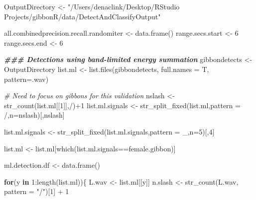 \documentclass[
]{book}
\newenvironment{Shaded}{\begin{snugshade}}{\end{snugshade}}
\newcommand{\AttributeTok}[1]{\textcolor[rgb]{0.77,0.63,0.00}{#1}}
\newcommand{\CommentTok}[1]{\textcolor[rgb]{0.56,0.35,0.01}{\textit{#1}}}
\newcommand{\ControlFlowTok}[1]{\textcolor[rgb]{0.13,0.29,0.53}{\textbf{#1}}}
\newcommand{\DecValTok}[1]{\textcolor[rgb]{0.00,0.00,0.81}{#1}}
\newcommand{\DocumentationTok}[1]{\textcolor[rgb]{0.56,0.35,0.01}{\textbf{\textit{#1}}}}
\newcommand{\FunctionTok}[1]{\textcolor[rgb]{0.00,0.00,0.00}{#1}}
\newcommand{\NormalTok}[1]{#1}
\newcommand{\OtherTok}[1]{\textcolor[rgb]{0.56,0.35,0.01}{#1}}
\newcommand{\SpecialCharTok}[1]{\textcolor[rgb]{0.00,0.00,0.00}{#1}}
\newcommand{\StringTok}[1]{\textcolor[rgb]{0.31,0.60,0.02}{#1}}
\begin{document}
\begin{Shaded}
\begin{Highlighting}[]
\NormalTok{  OutputDirectory }\OtherTok{\textless{}{-}}  \StringTok{"/Users/denaclink/Desktop/RStudio Projects/gibbonR/data/DetectAndClassifyOutput"}
    
\NormalTok{  all.combinedprecision.recall.randomiter }\OtherTok{\textless{}{-}} \FunctionTok{data.frame}\NormalTok{()}
\NormalTok{  range.secs.start }\OtherTok{\textless{}{-}} \DecValTok{6}
\NormalTok{  range.secs.end }\OtherTok{\textless{}{-}} \DecValTok{6}
  
  \DocumentationTok{\#\#\# Detections using band{-}limited energy summation}
\NormalTok{  gibbondetects }\OtherTok{\textless{}{-}}\NormalTok{ OutputDirectory}
\NormalTok{  list.ml }\OtherTok{\textless{}{-}}  \FunctionTok{list.files}\NormalTok{(gibbondetects, }\AttributeTok{full.names =}\NormalTok{ T, }\AttributeTok{pattern=}\StringTok{\textquotesingle{}.wav\textquotesingle{}}\NormalTok{)}

  
  \CommentTok{\# Need to focus on gibbons for this validation}
\NormalTok{  nslash }\OtherTok{\textless{}{-}} \FunctionTok{str\_count}\NormalTok{(list.ml[[}\DecValTok{1}\NormalTok{]],}\StringTok{\textquotesingle{}/\textquotesingle{}}\NormalTok{)}\SpecialCharTok{+}\DecValTok{1}
\NormalTok{  list.ml.signals }\OtherTok{\textless{}{-}} \FunctionTok{str\_split\_fixed}\NormalTok{(list.ml,}\AttributeTok{pattern =} \StringTok{\textquotesingle{}/\textquotesingle{}}\NormalTok{,}\AttributeTok{n=}\NormalTok{nslash)[,nslash]}
  
\NormalTok{  list.ml.signals }\OtherTok{\textless{}{-}} \FunctionTok{str\_split\_fixed}\NormalTok{(list.ml.signals,}\AttributeTok{pattern =} \StringTok{\textquotesingle{}\_\textquotesingle{}}\NormalTok{,}\AttributeTok{n=}\DecValTok{5}\NormalTok{)[,}\DecValTok{4}\NormalTok{]}
  
  
\NormalTok{  list.ml }\OtherTok{\textless{}{-}} 
\NormalTok{    list.ml[}\FunctionTok{which}\NormalTok{(list.ml.signals}\SpecialCharTok{==}\StringTok{\textquotesingle{}female.gibbon\textquotesingle{}}\NormalTok{)]}
  
  
\NormalTok{  ml.detection.df }\OtherTok{\textless{}{-}} \FunctionTok{data.frame}\NormalTok{()}
  
  \ControlFlowTok{for}\NormalTok{(y }\ControlFlowTok{in} \DecValTok{1}\SpecialCharTok{:}\FunctionTok{length}\NormalTok{(list.ml))\{}
\NormalTok{    L.wav }\OtherTok{\textless{}{-}}\NormalTok{ list.ml[[y]]}
\NormalTok{    n.slash  }\OtherTok{\textless{}{-}} \FunctionTok{str\_count}\NormalTok{(L.wav, }\AttributeTok{pattern =} \StringTok{"/"}\NormalTok{)[}\DecValTok{1}\NormalTok{] }\SpecialCharTok{+} \DecValTok{1}
    

\end{Highlighting}
\end{Shaded}
\end{document}

